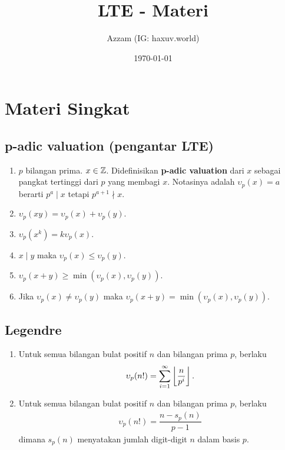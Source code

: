 \documentclass[11pt]{scrartcl}
\title{LTE - Materi}
\author{Azzam (IG: haxuv.world)}
\date{\today}
\begin{document}
\maketitle

\section{Materi Singkat}
\subsection{p-adic valuation (pengantar LTE)}
\begin{enumerate}
    \item $p$ bilangan prima. $x \in \mathbb Z$. Didefinisikan \textbf{p-adic valuation} dari $x$ sebagai pangkat tertinggi dari $p$ yang membagi $x$. Notasinya adalah $\upsilon_p(x)=a$ berarti $p^a \mid x$ tetapi $p^{a+1} \nmid x$.
    \item $\upsilon_p(xy) = \upsilon_p(x) + \upsilon_p(y)$.
    \item $\upsilon_p(x^k)=k\upsilon_p(x)$.
    \item $x \mid y$ maka $\upsilon_p(x) \le \upsilon_p(y)$.
    \item $\upsilon_p(x+y) \ge \min(\upsilon_p(x),\upsilon_p(y))$.
    \item Jika $\upsilon_p(x) \neq \upsilon_p(y)$ maka $\upsilon_p(x+y) = \min(\upsilon_p(x),\upsilon_p(y))$.
\end{enumerate}

\subsection{Legendre}
\begin{enumerate}
    \item Untuk semua bilangan bulat positif $n$ dan bilangan prima $p$, berlaku
\begin{align*}
    \upsilon_p(n!) = \sum_{i=1}^{\infty} \left\lfloor \frac{n}{p^i} \right\rfloor.
\end{align*}

    \item Untuk semua bilangan bulat positif $n$ dan bilangan prima $p$, berlaku
\begin{align*}
    \upsilon_p(n!) = \dfrac{n-s_p(n)}{p-1}
\end{align*}
    dimana $s_p(n)$ menyatakan jumlah digit-digit $n$ dalam basis $p$.
\end{enumerate}
\end{document}
